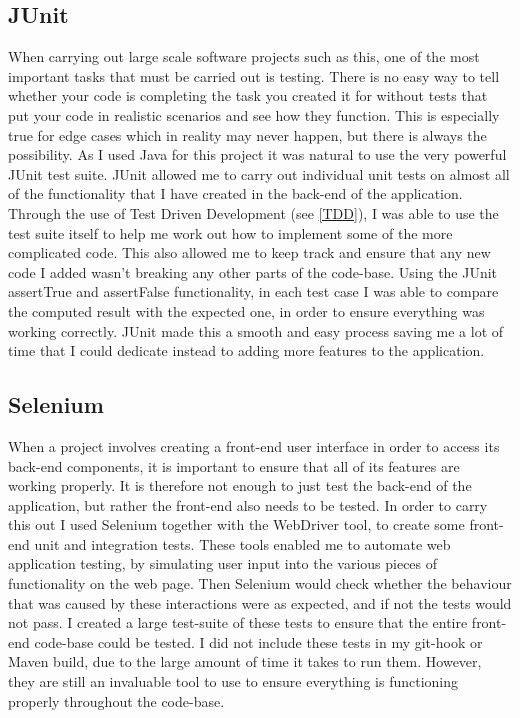 \subsection{JUnit\label{JUnit}}

When carrying out large scale software projects such as this, one of the most important tasks that must be carried out is testing. There is no easy way to tell whether your code is completing the task you created it for without tests that put your code in realistic scenarios and see how they function. This is especially true for edge cases which in reality may never happen, but there is always the possibility. As I used Java for this project it was natural to use the very powerful JUnit test suite. JUnit allowed me to carry out individual unit tests on almost all of the functionality that I have created in the back-end of the application. Through the use of Test Driven Development (see \ref{TDD}), I was able to use the test suite itself to help me work out how to implement some of the more complicated code. This also allowed me to keep track and ensure that any new code I added wasn't breaking any other parts of the code-base. Using the JUnit assertTrue and assertFalse functionality, in each test case I was able to compare the computed result with the expected one, in order to ensure everything was working correctly. JUnit made this a smooth and easy process saving me a lot of time that I could dedicate instead to adding more features to the application.

\subsection{Selenium \label{selenium}}

When a project involves creating a front-end user interface in order to access its back-end components, it is important to ensure that all of its features are working properly. It is therefore not enough to just test the back-end of the application, but rather the front-end also needs to be tested. In order to carry this out I used Selenium together with the WebDriver tool, to create some front-end unit and integration tests. These tools enabled me to automate web application testing, by simulating user input into the various pieces of functionality on the web page. Then Selenium would check whether the behaviour that was caused by these interactions were as expected, and if not the tests would not pass. I created a large test-suite of these tests to ensure that the entire front-end code-base could be tested. I did not include these tests in my git-hook or Maven build, due to the large amount of time it takes to run them. However, they are still an invaluable tool to use to ensure everything is functioning properly throughout the code-base.

